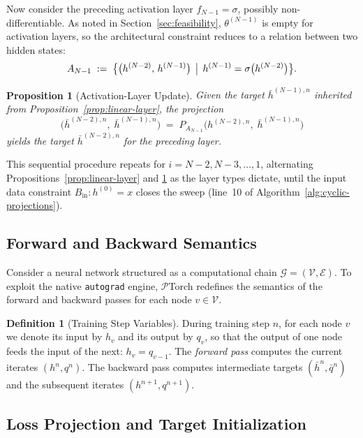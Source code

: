 \documentclass{article}
\theoremstyle{plain}
\newtheorem{proposition}[theorem]{Proposition}
\theoremstyle{definition}
\newtheorem{definition}[theorem]{Definition}
\theoremstyle{remark}
\begin{document}
Now consider the preceding activation layer $f_{N-1} = \sigma$, possibly non-differentiable.
As noted in Section~\ref{sec:feasibility}, $\theta^{(N-1)}$ is empty for activation layers,
so the architectural constraint reduces to a relation between two hidden states:
\[
A_{N-1} \;:=\; \bigl\{\bigl(h^{(N-2)},\, h^{(N-1)}\bigr) \,\bigm|\,
h^{(N-1)} = \sigma\bigl(h^{(N-2)}\bigr) \bigr\}.
\]
 
\begin{proposition}[Activation-Layer Update]
\label{prop:activation-layer}
Given the target $\bar{h}^{(N-1),n}$ inherited from
Proposition~\ref{prop:linear-layer}, the projection
\begin{equation}
\bigl(\bar{h}^{(N-2),n},\; \bar{h}^{(N-1),n}\bigr)
\;=\; P_{A_{N-1}}\!\bigl(h^{(N-2),n},\; \bar{h}^{(N-1),n}\bigr)
\end{equation}
yields the target $\bar{h}^{(N-2),n}$ for the preceding layer.
\end{proposition}
 
This sequential procedure repeats for $i = N-2, N-3, \dots, 1$, alternating
Propositions~\ref{prop:linear-layer} and \ref{prop:activation-layer} as the layer types
dictate, until the input data constraint $B_{\mathrm{in}}: h^{(0)} = x$ closes the sweep
(line~10 of Algorithm~\ref{alg:cyclic-projections}).


\subsection{Forward and Backward Semantics}

Consider a neural network structured as a computational chain $\mathcal{G} = (\mathcal{V}, \mathcal{E})$. To exploit the native \texttt{autograd} engine, $\mathcal{P}$Torch redefines the semantics of the forward and backward passes for each node $v \in \mathcal{V}$.

\begin{definition}[Training Step Variables]
During training step $n$, for each node $v$ we denote its input by $h_v$ and its output by $q_v$, so that the output of one node feeds the input of the next: $h_{v} = q_{v-1}$. The \emph{forward pass} computes the current iterates $(h^{n}, q^{n})$. The backward pass computes intermediate targets $(\bar{h}^{n}, \bar{q}^{n})$ and the subsequent iterates $(h^{n+1}, q^{n+1})$.
\end{definition}

\subsection{Loss Projection and Target Initialization}
\end{document}
